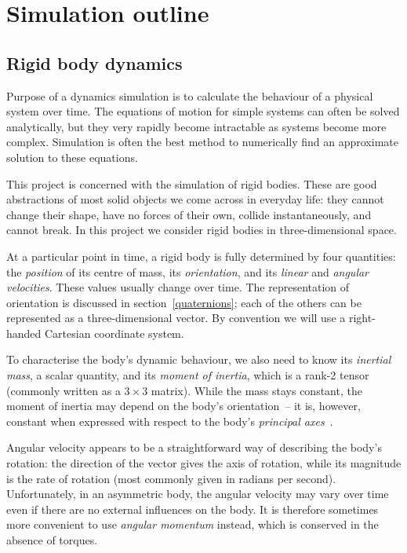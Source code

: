 \section{Simulation outline}

\subsection{Rigid body dynamics}

Purpose of a dynamics simulation is to calculate the behaviour of a physical system over time.
The equations of motion for simple systems can often be solved analytically, but they very
rapidly become intractable as systems become more complex. Simulation is often the best
method to numerically find an approximate solution to these equations.

This project is concerned with the simulation of rigid bodies. These are good abstractions of
most solid objects we come across in everyday life: they cannot change their shape, have no
forces of their own, collide instantaneously, and cannot break. In this project we consider
rigid bodies in three-dimensional space.

At a particular point in time, a rigid body is fully determined by four quantities: the
{\em position} of its centre of mass, its {\em orientation}, and its {\em linear} and
{\em angular velocities}. These values usually change over time. The representation of
orientation is discussed in section~\ref{quaternions}; each of the others can be
represented as a three-dimensional vector. By convention we will use a right-handed Cartesian
coordinate system.

To characterise the body's dynamic behaviour, we also need to know its {\em inertial mass},
a scalar quantity, and its {\em moment of inertia}, which is a rank-2 tensor (commonly written
as a $3\times3$ matrix). While the mass stays constant, the moment of inertia may
depend on the body's orientation~-- it is, however, constant when expressed with respect to the
body's {\em principal axes}~\cite{Feynman:63}.

Angular velocity appears to be a straightforward way of describing the body's rotation: the
direction of the vector gives the axis of rotation, while its magnitude is the rate of rotation
(most commonly given in radians per second). Unfortunately, in an asymmetric body, the angular
velocity may vary over time even if there are no external influences on the body. It is therefore
sometimes more convenient to use {\em angular momentum} instead, which is conserved in the
absence of torques.

